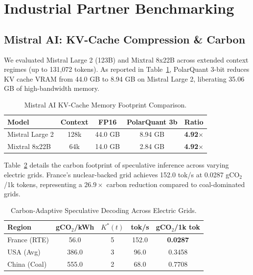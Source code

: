 \documentclass[10pt,twocolumn]{article}
\begin{document}
\section{Industrial Partner Benchmarking}

\subsection{Mistral AI: KV-Cache Compression \& Carbon}

We evaluated Mistral Large 2 (123B) and Mixtral 8x22B across extended context regimes (up to 131,072 tokens). As reported in Table~\ref{tab:mistral_kv}, PolarQuant 3-bit reduces KV cache VRAM from 44.0 GB to 8.94 GB on Mistral Large 2, liberating 35.06 GB of high-bandwidth memory.

\begin{table}[h]
\centering
\small
\caption{Mistral AI KV-Cache Memory Footprint Comparison.}
\label{tab:mistral_kv}
\begin{tabular}{lcccc}
\toprule
\textbf{Model} & \textbf{Context} & \textbf{FP16} & \textbf{PolarQuant 3b} & \textbf{Ratio} \\
\midrule
Mistral Large 2 & 128k & 44.0 GB & 8.94 GB & \textbf{4.92$\times$} \\
Mixtral 8x22B   & 64k  & 14.0 GB & 2.84 GB & \textbf{4.92$\times$} \\
\bottomrule
\end{tabular}
\end{table}

Table~\ref{tab:carbon} details the carbon footprint of speculative inference across varying electric grids. France's nuclear-backed grid achieves 152.0 tok/s at 0.0287 gCO$_2$/1k tokens, representing a $26.9\times$ carbon reduction compared to coal-dominated grids.

\begin{table}[h]
\centering
\small
\caption{Carbon-Adaptive Speculative Decoding Across Electric Grids.}
\label{tab:carbon}
\begin{tabular}{lcccc}
\toprule
\textbf{Region} & \textbf{gCO$_2$/kWh} & $K^*(t)$ & \textbf{tok/s} & \textbf{gCO$_2$/1k tok} \\
\midrule
France (RTE) & 56.0  & 5 & 152.0 & \textbf{0.0287} \\
USA (Avg)    & 386.0 & 3 & 96.0  & 0.3458 \\
China (Coal) & 555.0 & 2 & 68.0  & 0.7708 \\
\bottomrule
\end{tabular}
\end{table}
\end{document}
